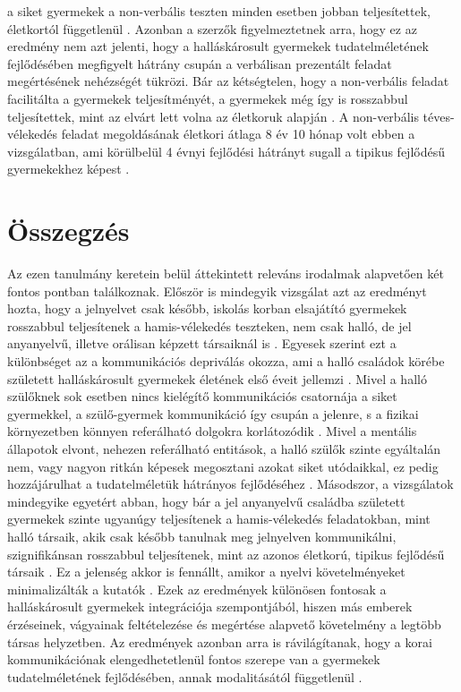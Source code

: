 a siket gyermekek a non-verbális teszten minden esetben jobban teljesítettek, életkortól
függetlenül \autocite{figueras-costa_harris_2001}. Azonban a szerzők figyelmeztetnek arra, hogy ez az eredmény nem azt
jelenti, hogy a halláskárosult gyermekek tudatelméletének fejlődésében megfigyelt hátrány
csupán a verbálisan prezentált feladat megértésének nehézségét tükrözi. Bár az kétségtelen,
hogy a non-verbális feladat facilitálta a gyermekek teljesítményét, a gyermekek még így is
rosszabbul teljesítettek, mint az elvárt lett volna az életkoruk alapján \autocite{figueras-costa_harris_2001}. A non-verbális
téves-vélekedés feladat megoldásának életkori átlaga 8 év 10 hónap volt ebben a vizsgálatban,
ami körülbelül 4 évnyi fejlődési hátrányt sugall a tipikus fejlődésű gyermekekhez képest
\autocite{figueras-costa_harris_2001}.



\section*{Összegzés}

Az ezen tanulmány keretein belül áttekintett releváns irodalmak alapvetően két fontos
pontban találkoznak. Először is mindegyik vizsgálat azt az eredményt hozta, hogy a jelnyelvet
csak később, iskolás korban elsajátító gyermekek rosszabbul teljesítenek a hamis-vélekedés
teszteken, nem csak halló, de jel anyanyelvű, illetve orálisan képzett társaiknál is \autocite{peterson_slaughter_2006,woolfe_want_siegal_2002,peterson_siegal_1999}.
Egyesek szerint ezt a különbséget az a kommunikációs depriválás okozza, ami a halló
családok körébe született halláskárosult gyermekek életének első éveit jellemzi \autocite{perner_leekam_wimmer_1987}. Mivel a
halló szülőknek sok esetben nincs kielégítő kommunikációs csatornája a siket gyermekkel, a
szülő-gyermek kommunikáció így csupán a jelenre, s a fizikai környezetben könnyen
referálható dolgokra korlátozódik \autocite{peterson_siegal_2000}. Mivel a mentális állapotok elvont, nehezen
referálható entitások, a halló szülők szinte egyáltalán nem, vagy nagyon ritkán képesek
megosztani azokat siket utódaikkal, ez pedig hozzájárulhat a tudatelméletük hátrányos
fejlődéséhez \autocite{peterson_siegal_2000}. Másodszor, a vizsgálatok mindegyike egyetért abban, hogy bár a
jel anyanyelvű családba született gyermekek szinte ugyanúgy teljesítenek a hamis-vélekedés
feladatokban, mint halló társaik, akik csak később tanulnak meg jelnyelven kommunikálni,
szignifikánsan rosszabbul teljesítenek, mint az azonos életkorú, tipikus fejlődésű társaik \autocite{peterson_slaughter_2006,woolfe_want_siegal_2002,peterson_siegal_1999}.
Ez a jelenség akkor is fennállt, amikor a nyelvi követelményeket minimalizálták a kutatók
\autocite{figueras-costa_harris_2001}. Ezek az eredmények különösen fontosak a halláskárosult gyermekek integrációja
szempontjából, hiszen más emberek érzéseinek, vágyainak feltételezése és megértése alapvető
követelmény a legtöbb társas helyzetben. Az eredmények azonban arra is rávilágítanak, hogy
a korai kommunikációnak elengedhetetlenül fontos szerepe van a gyermekek
tudatelméletének fejlődésében, annak modalitásától függetlenül \autocite{peterson_2004}.
